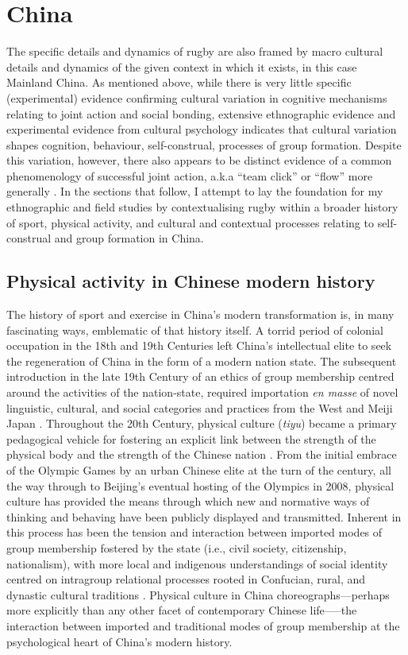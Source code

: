 \section{China}
The specific details and dynamics of rugby are also framed by macro cultural details and dynamics of the given context in which it exists, in this case Mainland China.  As mentioned above, while there is very little specific (experimental) evidence confirming cultural variation in cognitive mechanisms relating to joint action and social bonding, extensive ethnographic evidence and experimental evidence from cultural psychology indicates that cultural variation shapes cognition, behaviour, self-construal, processes of group formation.  Despite this variation, however, there also appears to be distinct evidence of a common phenomenology of successful joint action, a.k.a ``team click'' or ``flow'' more generally \citep{Weed2011,Slingerland2000,Slingerland2014}. In the sections that follow, I attempt to lay the foundation for my ethnographic and field studies by contextualising rugby within a broader history of sport, physical activity, and cultural and contextual processes relating to self-construal and group formation in China.





\subsection{Physical activity in Chinese modern history}
The history of sport and exercise in China's modern transformation is, in many fascinating ways, emblematic of that history itself. A torrid period of colonial occupation in the 18th and 19th Centuries left China's intellectual elite to seek the regeneration of China in the form of a modern nation state.  The subsequent introduction in the late 19th Century of an ethics of group membership centred around the activities of the nation-state, required importation \textit{en masse} of novel linguistic, cultural, and social categories and practices from the West and Meiji Japan \citep{Liu1995}.  Throughout the 20th Century, physical culture (\textit{tiyu}) became a primary pedagogical vehicle for fostering an explicit link between the strength of the physical body and the strength of the Chinese nation \cites[32]{Morris2004}[49]{Brownell1995}.  From the initial embrace of the Olympic Games by an urban Chinese elite at the turn of the century, all the way through to Beijing's eventual hosting of the Olympics in 2008, physical culture has provided the means through which new and normative ways of thinking and behaving have been publicly displayed and transmitted.  Inherent in this process has been the tension and interaction between imported modes of group membership fostered by the state (i.e., civil society, citizenship, nationalism), with more local and indigenous understandings of social identity centred on intragroup relational processes rooted in Confucian, rural, and dynastic cultural traditions \citep{Fei1992}.  Physical culture in China choreographs---perhaps more explicitly than any other facet of contemporary Chinese life—--the interaction between imported and traditional modes of group membership at the psychological heart of China's modern history.


